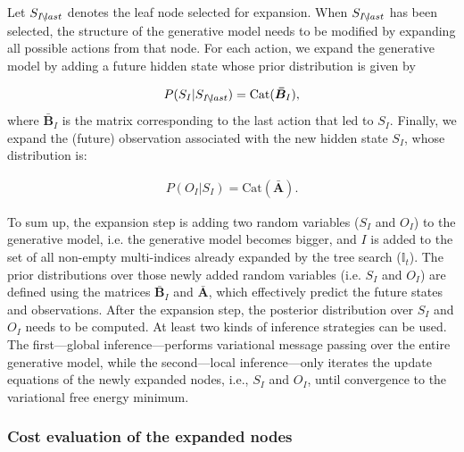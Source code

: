 \documentclass[twoside,11pt]{article}
\newcommand*\IdMLast[1]{{\normalfont #1\hspace{-0.04cm}\setminus\hspace{-0.04cm} last}}
\begin{document}
Let $S_\IdMLast{I}$ denotes the leaf node selected for expansion. When $S_\IdMLast{I}$ has been selected, the structure of the generative model needs to be modified by expanding all possible actions from that node. For each action, we expand the generative model by adding a future hidden state whose prior distribution is given by

\begin{align}
P(S_I|S_\IdMLast{I}) = \text{Cat}(\bm{\bar{B}}_I),
\end{align}
where $\bm{\bar{B}}_I$ is the matrix corresponding to the last action that led to $S_I$. Finally, we expand the (future) observation associated with the new hidden state $S_I$, whose distribution is:

\begin{align}
P(O_I|S_I) = \text{Cat}(\bm{\bar{A}}).
\end{align}

To sum up, the expansion step is adding two random variables ($S_I$ and $O_I$) to the generative model, i.e. the generative model becomes bigger, and $I$ is added to the set of all non-empty multi-indices already expanded by the tree search ($\mathbb{I}_t$). The prior distributions over those newly added random variables (i.e. $S_I$ and $O_I$) are defined using the matrices $\bm{\bar{B}}_I$ and $\bm{\bar{A}}$, which effectively predict the future states and observations. After the expansion step, the posterior distribution over $S_I$ and $O_I$ needs to be computed. At least two kinds of inference strategies can be used. The first---global inference---performs variational message passing over the entire generative model, while the second---local inference---only iterates the update equations of the newly expanded nodes, i.e., $S_I$ and $O_I$, until convergence to the variational free energy minimum.

\subsubsection{Cost evaluation of the expanded nodes} \label{sec:quality}
\end{document}
